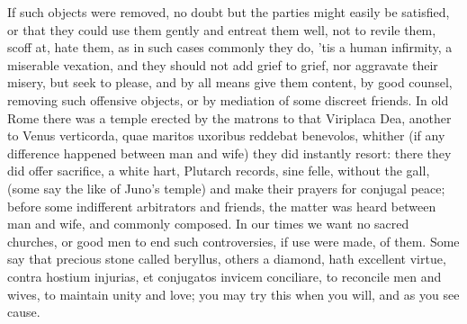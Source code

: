 {If such objects were removed, no doubt but the parties might easily be
satisfied, or that they could use them gently and entreat them well,
not to revile them, scoff at, hate them, as in such cases commonly they
do, 'tis a human infirmity, a miserable vexation, and they should not
add grief to grief, nor aggravate their misery, but seek to please, and
by all means give them content, by good counsel, removing such
offensive objects, or by mediation of some discreet friends. In old
Rome there was a temple erected by the matrons to that Viriplaca
Dea, another to Venus verticorda, quae maritos uxoribus reddebat
benevolos, whither (if any difference happened between man and wife)
they did instantly resort: there they did offer sacrifice, a white
hart, Plutarch records, sine felle, without the gall, (some say the
like of Juno's temple) and make their prayers for conjugal peace;
before some  indifferent arbitrators and friends, the matter was
heard between man and wife, and commonly composed. In our times we want
no sacred churches, or good men to end such controversies, if use were
made, of them. Some say that precious stone called beryllus,
others a diamond, hath excellent virtue, contra hostium injurias, et
conjugatos invicem conciliare, to reconcile men and wives, to maintain
unity and love; you may try this when you will, and as you see cause.

}
